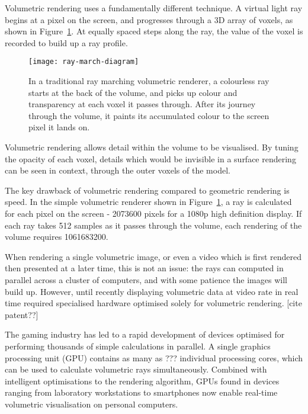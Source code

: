 Volumetric rendering uses a fundamentally different technique.
A virtual light ray begins at a pixel on the screen, and progresses through a 3D array of voxels, as shown in Figure~\ref{fig:raymarchDiagram}.
At equally spaced steps along the ray, the value of the voxel is recorded to build up a ray profile.

\begin{figure}[htbp!]
\centering
\texttt{[image: ray-march-diagram]}
\caption[FPBioimage: Raymarching facilitates volumetric rendering of 3D data]{In a traditional ray marching volumetric renderer, a colourless ray starts at the back of the volume, and picks up colour and transparency at each voxel it passes through. After its journey through the volume, it paints its accumulated colour to the screen pixel it lands on. }
\label{fig:raymarchDiagram}
\end{figure}

Volumetric rendering allows detail within the volume to be visualised. 
By tuning the opacity of each voxel, details which would be invisible in a surface rendering can be seen in context, through the outer voxels of the model. 

The key drawback of volumetric rendering compared to geometric rendering is speed. 
In the simple volumetric renderer shown in Figure~\ref{fig:raymarchDiagram}, a ray is calculated for each pixel on the screen - \num{2073600} pixels for a 1080p high definition display. 
If each ray takes \num{512} samples as it passes through the volume, each rendering of the volume requires \num{1061683200}. 

When rendering a single volumetric image, or even a video which is first rendered then presented at a later time, this is not an issue: the rays can computed in parallel across a cluster of computers, and with some patience the images will build up. 
However, until recently displaying volumetric data at video rate in real time required specialised hardware optimised solely for volumetric rendering. [cite patent??]

The gaming industry has led to a rapid development of devices optimised for performing thousands of simple calculations in parallel. 
A single graphics processing unit (GPU) contains as many as ??? individual processing cores, which can be used to calculate volumetric rays simultaneously. 
Combined with intelligent optimisations to the rendering algorithm, GPUs found in devices ranging from laboratory workstations to smartphones now enable real-time volumetric visualisation on personal computers. 

